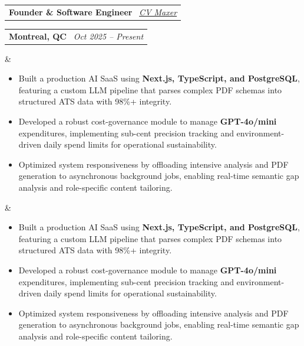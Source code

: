 \documentclass[10pt,a4paper,sans]{moderncv}
\makeatletter
\newcommand*{\customcventry}[7][.13em]{
\begin{tabular}{@{}l}
{\bfseries #4} \
{\itshape #3}
\end{tabular}
\hfill
\begin{tabular}{l@{}}
{\bfseries #5} \
{\itshape #2}
\end{tabular}
\ifx&#7&%
\else
{%
\begin{minipage}{\maincolumnwidth}%
\raggedright
#7%
\end{minipage}%
}%
\fi
\par\addvspace{#1}}
\makeatother
\begin{document}



\customcventry{Oct 2025 -- Present}{{\color{blue}\href{}{CV Maxer}}}
{Founder \& Software Engineer}
{Montreal, QC}{}{
\renewcommand{\labelitemi}{\textbullet}
\begin{itemize} \itemsep -1pt
    \item Built a production AI SaaS using \textbf{Next.js, TypeScript, and PostgreSQL}, featuring a custom LLM pipeline that parses complex PDF schemas into structured ATS data with 98\%+ integrity.
    \item Developed a robust cost-governance module to manage \textbf{GPT-4o/mini} expenditures, implementing sub-cent precision tracking and environment-driven daily spend limits for operational sustainability.
    \item Optimized system responsiveness by offloading intensive analysis and PDF generation to asynchronous background jobs, enabling real-time semantic gap analysis and role-specific content tailoring. \linebreak
\end{itemize}
}
\end{document}
